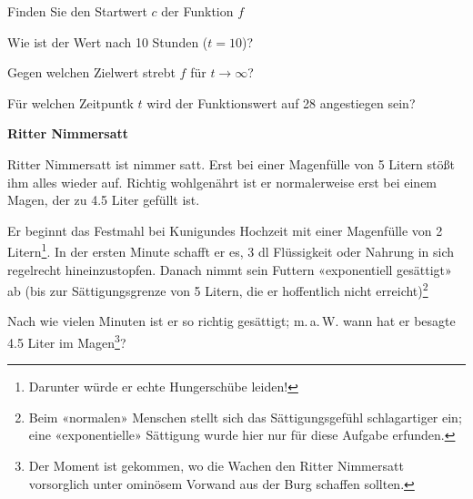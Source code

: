 \begin{bbwAufgabenBlock}
\item Finden Sie den Startwert $c$ der Funktion $f$

\item Wie ist der Wert nach 10 Stunden ($t=10$)?

\item Gegen welchen Zielwert strebt $f$ für  $t\rightarrow\infty$?

\item Für welchen Zeitpuntk $t$ wird der Funktionswert auf 28
  angestiegen sein?
  
\end{bbwAufgabenBlock}  

\platzFuerBerechnungenBisEndeSeite{}



\bbwActAufgabenNr{} \textbf{Ritter Nimmersatt}

\nextBbwAufgabenNummer{}

Ritter Nimmersatt ist nimmer satt. Erst bei einer Magenfülle von
5 Litern stößt ihm alles wieder auf. Richtig wohlgenährt ist er
normalerweise erst bei einem Magen, der zu 4.5 Liter gefüllt ist.

Er beginnt das Festmahl bei Kunigundes Hochzeit mit einer Magenfülle
von 2 Litern\footnote{Darunter würde er echte Hungerschübe
  leiden!}. In der ersten Minute schafft er es, 3 dl Flüssigkeit oder Nahrung
in sich regelrecht hineinzustopfen. Danach nimmt sein Futtern
«exponentiell gesättigt» ab (bis zur Sättigungsgrenze von 5 Litern, die er
hoffentlich nicht erreicht)\footnote{Beim «normalen» Menschen stellt
  sich das Sättigungsgefühl schlagartiger ein; eine «exponentielle»
  Sättigung wurde hier nur für diese Aufgabe erfunden.}%

Nach wie vielen Minuten ist er so richtig gesättigt; m.\,a.\,W. wann
hat er besagte 4.5 Liter im Magen\footnote{Der Moment ist gekommen, wo
  die Wachen den Ritter Nimmersatt vorsorglich unter ominösem Vorwand aus der Burg schaffen sollten.}?

\newpage


